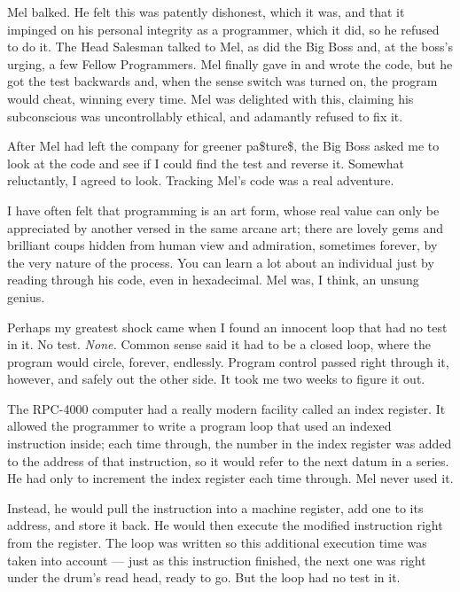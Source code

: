 \documentclass[12pt]{article}
\begin{document}
\bigskip
\noindent
Mel balked. He felt this was patently dishonest, which it
was, and that it impinged on his personal integrity as a
programmer, which it did, so he refused to do it. The Head
Salesman talked to Mel, as did the Big Boss and, at the
boss's urging, a few Fellow Programmers. Mel finally gave
in and wrote the code, but he got the test backwards and,
when the sense switch was turned on, the program would
cheat, winning every time. Mel was delighted with this,
claiming his subconscious was uncontrollably ethical, and
adamantly refused to fix it.

\bigskip
\noindent
After Mel had left the company for greener pa\$ture\$, the Big
Boss asked me to look at the code and see if I could find
the test and reverse it. Somewhat reluctantly, I agreed to
look. Tracking Mel's code was a real adventure.

\bigskip
\noindent
I have often felt that programming is an art form, whose
real value can only be appreciated by another versed in the
same arcane art; there are lovely gems and brilliant coups
hidden from human view and admiration, sometimes forever, by
the very nature of the process. You can learn a lot about
an individual just by reading through his code, even in
hexadecimal. Mel was, I think, an unsung genius.

\bigskip
\noindent
Perhaps my greatest shock came when I found an innocent loop
that had no test in it. No test. {\it None.} Common sense said
it had to be a closed loop, where the program would circle,
forever, endlessly. Program control passed right through
it, however, and safely out the other side. It took me two
weeks to figure it out.

\bigskip
\noindent
The RPC-4000 computer had a really modern facility called an
index register. It allowed the programmer to write a
program loop that used an indexed instruction inside; each
time through, the number in the index register was added to
the address of that instruction, so it would refer to the
next datum in a series. He had only to increment the index
register each time through. Mel never used it.

\bigskip
\noindent
Instead, he would pull the instruction into a machine
register, add one to its address, and store it back. He
would then execute the modified instruction right from the
register. The loop was written so this additional execution
time was taken into account --- just as this instruction
finished, the next one was right under the drum's read head,
ready to go. But the loop had no test in it.
\end{document}
